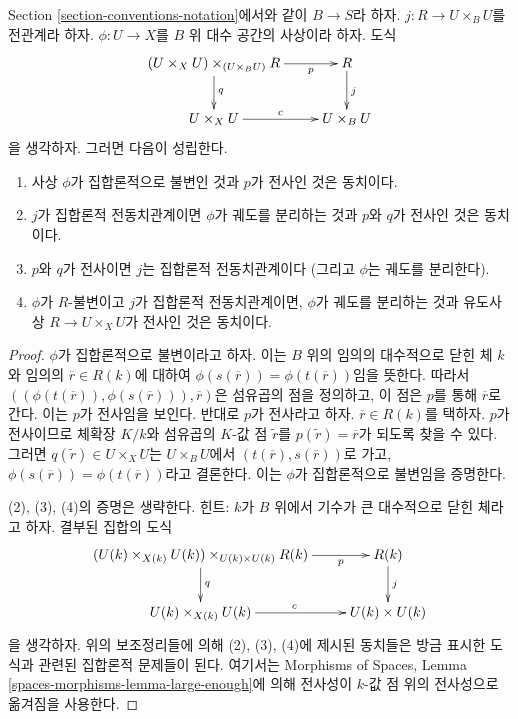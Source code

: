 \begin{lemma}
\label{lemma-separates-orbits}
Section \ref{section-conventions-notation}에서와 같이 $B \to S$라 하자.
$j : R \to U \times_B U$를 전관계라 하자.
$\phi : U \to X$를 $B$ 위 대수 공간의 사상이라 하자.
도식
$$
\xymatrix{
(U \times_X U) \times_{(U \times_B U)} R \ar[d]^q \ar[r]_-p & R \ar[d]^j \\
U \times_X U \ar[r]^c & U \times_B U
}
$$
을 생각하자. 그러면 다음이 성립한다.
\begin{enumerate}
\item 사상 $\phi$가 집합론적으로 불변인 것과 $p$가 전사인 것은 동치이다.
\item $j$가 집합론적 전동치관계이면 $\phi$가 궤도를 분리하는 것과
$p$와 $q$가 전사인 것은 동치이다.
\item $p$와 $q$가 전사이면 $j$는 집합론적 전동치관계이다
(그리고 $\phi$는 궤도를 분리한다).
\item $\phi$가 $R$-불변이고 $j$가 집합론적 전동치관계이면,
$\phi$가 궤도를 분리하는 것과 유도사상
$R \to U \times_X U$가 전사인 것은 동치이다.
\end{enumerate}
\end{lemma}

\begin{proof}
$\phi$가 집합론적으로 불변이라고 하자. 이는 $B$ 위의 임의의
대수적으로 닫힌 체 $k$와 임의의 $\overline{r} \in R(k)$에 대하여
$\phi(s(\overline{r})) = \phi(t(\overline{r}))$임을 뜻한다. 따라서
$((\phi(t(\overline{r})), \phi(s(\overline{r}))), \overline{r})$은
섬유곱의 점을 정의하고, 이 점은 $p$를 통해 $\overline{r}$로 간다.
이는 $p$가 전사임을 보인다. 반대로 $p$가 전사라고 하자.
$\overline{r} \in R(k)$를 택하자. $p$가 전사이므로 체확장
$K/k$와 섬유곱의 $K$-값 점 $\tilde r$를
$p(\tilde r) = \overline{r}$가 되도록 찾을 수 있다.
그러면 $q(\tilde r) \in U \times_X U$는 $U \times_B U$에서
$(t(\overline{r}), s(\overline{r}))$로 가고,
$\phi(s(\overline{r})) = \phi(t(\overline{r}))$라고 결론한다.
이는 $\phi$가 집합론적으로 불변임을 증명한다.

\medskip\noindent
(2), (3), (4)의 증명은 생략한다. 힌트: $k$가 $B$ 위에서
기수가 큰 대수적으로 닫힌 체라고 하자. 결부된 집합의 도식
$$
\xymatrix{
(U(k) \times_{X(k)} U(k)) \times_{U(k) \times U(k)} R(k) \ar[d]^q \ar[r]_-p &
R(k) \ar[d]^j \\
U(k) \times_{X(k)} U(k) \ar[r]^c & U(k) \times U(k)
}
$$
을 생각하자. 위의 보조정리들에 의해 (2), (3), (4)에 제시된
동치들은 방금 표시한 도식과 관련된 집합론적 문제들이 된다.
여기서는 Morphisms of Spaces, Lemma
\ref{spaces-morphisms-lemma-large-enough}에 의해 전사성이
$k$-값 점 위의 전사성으로 옮겨짐을 사용한다.
\end{proof}

